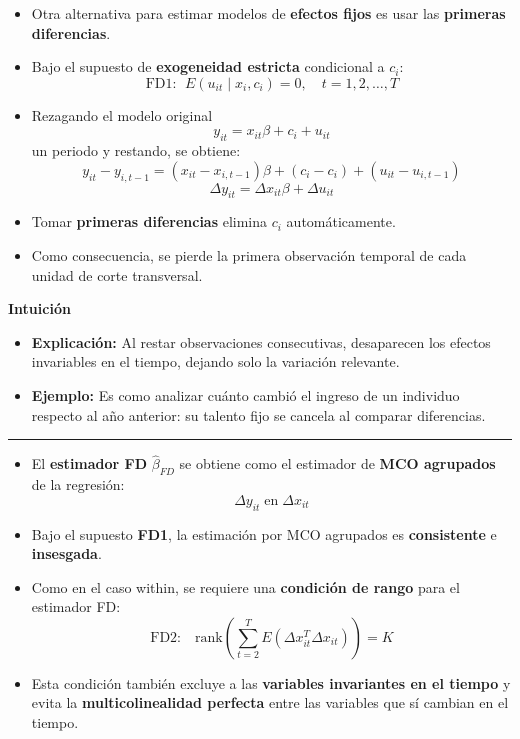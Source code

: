 \documentclass[12pt]{article}
\begin{document}
\begin{itemize}
    \item Otra alternativa para estimar modelos de \textbf{efectos fijos} es usar las \textbf{primeras diferencias}.
    
    \item Bajo el supuesto de \textbf{exogeneidad estricta} condicional a $c_i$:  
    \[
    \text{FD1: } \; E(u_{it} \mid x_i, c_i) = 0, \quad t = 1,2,\ldots,T
    \]
    
    \item Rezagando el modelo original 
    \[
    y_{it} = x_{it}\beta + c_i + u_{it}
    \]
    un periodo y restando, se obtiene:
    \[
    y_{it} - y_{i,t-1} = (x_{it} - x_{i,t-1})\beta + (c_i - c_i) + (u_{it} - u_{i,t-1})
    \]
    \[
    \Delta y_{it} = \Delta x_{it}\beta + \Delta u_{it}
    \]
    
    \item Tomar \textbf{primeras diferencias} elimina $c_i$ automáticamente.
    
    \item Como consecuencia, se pierde la primera observación temporal de cada unidad de corte transversal.
\end{itemize}

\noindent\textbf{Intuición}
\begin{itemize}
    \item \textbf{Explicación:} Al restar observaciones consecutivas, desaparecen los efectos invariables en el tiempo, dejando solo la variación relevante.
    \item \textbf{Ejemplo:} Es como analizar cuánto cambió el ingreso de un individuo respecto al año anterior: su talento fijo se cancela al comparar diferencias.
\end{itemize}

\hrule

\begin{itemize}
    \item El \textbf{estimador FD} $\hat{\beta}_{FD}$ se obtiene como el estimador de \textbf{MCO agrupados} de la regresión:
    \[
    \Delta y_{it} \; \text{en} \; \Delta x_{it}
    \]
    
    \item Bajo el supuesto \textbf{FD1}, la estimación por MCO agrupados es \textbf{consistente} e \textbf{insesgada}.
    
    \item Como en el caso within, se requiere una \textbf{condición de rango} para el estimador FD:
    \[
    \text{FD2:} \quad \text{rank}\left(\sum_{t=2}^T E(\Delta x_{it}^T \Delta x_{it})\right) = K
    \]
    
    \item Esta condición también excluye a las \textbf{variables invariantes en el tiempo} y evita la \textbf{multicolinealidad perfecta} entre las variables que sí cambian en el tiempo.
\end{itemize}
\end{document}
